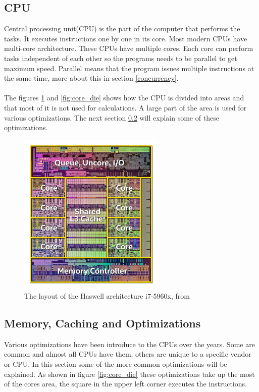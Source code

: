 \documentclass[10pt,a4paper]{report}
\begin{document}
\subsection{CPU}
Central processing unit(CPU) is the part of the computer that performs the tasks\cite{introduction_hpc_hager}. It executes instructions one by one in its core. Most modern CPUs have multi-core architecture. These CPUs have multiple cores\cite{introduction_hpc_hager}. Each core can perform tasks independent of each other so the programs needs to be parallel to get maximum speed. Parallel means that the program issues multiple instructions at the same time, more about this in section \ref{concurrency}.\\
\\
The figures \ref{fig:cpu_scheme} and \ref{fig:core_die} shows how the CPU is divided into areas and that most of it is not used for calculations. A large part of the area is used for various optimizations. The next section \ref{optimizations} will explain some of these optimizations.

\begin{figure}[h]
    \centering
    \includegraphics[width=7cm]{cpu_scheme_haswell.jpg}
    \caption{The layout of the Haswell architecture i7-5960x, from \cite{intel_haswell_2014}}
    \label{fig:cpu_scheme}
\end{figure}

\subsection{Memory, Caching and Optimizations}
\label{optimizations}
Various optimizations have been introduce to the CPUs over the years\cite{drepper2007cpumemory, introduction_hpc_hager}. Some are common and almost all CPUs have them, others are unique to a specific vendor or CPU\cite{introduction_hpc_hager}. In this section some of the more common optimizations will be explained. As shown in figure \ref{fig:core_die} these optimizations take up the most of the cores area, the square in the upper left corner executes the instructions.
\end{document}
